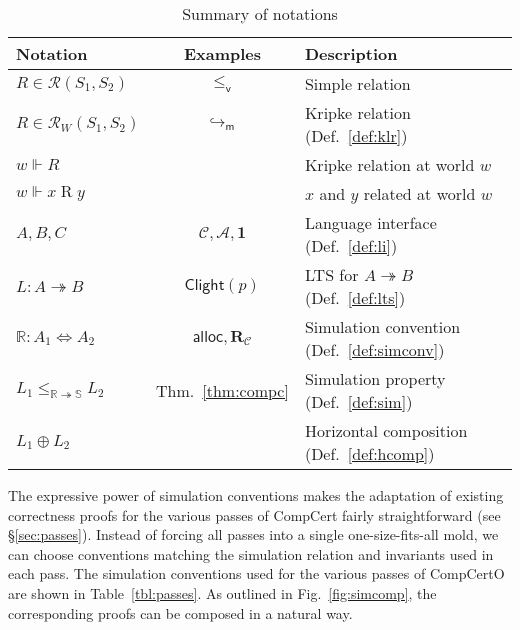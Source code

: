 \documentclass[acmsmall,authordraft]{acmart}
\newcommand{\kw}[1]{\ensuremath{ \mathsf{#1} }}
\newcommand{\que}{\circ}
\newcommand{\ans}{\bullet}
\newcommand{\vref}{\le_\kw{v}}
\begin{document}
\begin{table} %
  \begin{tabular}{lcl}
    \hline
    Notation & Examples & Description \\
    \hline
    $R \in \mathcal{R}(S_1, S_2)$ &
      $\vref$ &
      Simple relation \\
    $R \in \mathcal{R}_W(S_1, S_2)$ &
      $\hookrightarrow_\kw{m}$ &
      Kripke relation (Def.~\ref{def:klr}) \\
    $w \Vdash R$ & &
      Kripke relation at world $w$ \\
    $w \Vdash x \mathrel{R} y$ & &
      $x$ and $y$ related at world $w$ \\
    \hline
    $A, B, C$ &
      $\mathcal{C}, \mathcal{A}, \mathbf{1}$ &
      Language interface (Def.~\ref{def:li}) \\
    $L : A \twoheadrightarrow B$ &
      $\kw{Clight}(p)$ &
      LTS for $A \twoheadrightarrow B$ (Def.~\ref{def:lts}) \\
    $\mathbb{R} : A_1 \Leftrightarrow A_2$ &
      $\kw{alloc}, \mathbf{R}_\mathcal{C}$ &
      Simulation convention (Def.~\ref{def:simconv}) \\
    $L_1 \le_{\mathbb{R} \twoheadrightarrow \mathbb{S}} L_2$ &
      Thm.~\ref{thm:compc} &
      Simulation property (Def.~\ref{def:sim}) \\
    $L_1 \oplus L_2$ & &
      Horizontal composition (Def.~\ref{def:hcomp}) \\
    \hline
  \end{tabular}
  \caption{Summary of notations}
  \label{tbl:notations}
\end{table}

The expressive power of simulation conventions
makes the adaptation of existing correctness proofs
for the various passes of CompCert
fairly straightforward (see \S\ref{sec:passes}).
Instead of forcing all passes into a single one-size-fits-all mold,
we can choose conventions matching
the simulation relation and invariants
used in each pass.
The simulation conventions
used for the various passes of CompCertO
are shown in Table~\ref{tbl:passes}.
As outlined in Fig.~\ref{fig:simcomp},
the corresponding proofs can be composed in a natural way.
\end{document}

